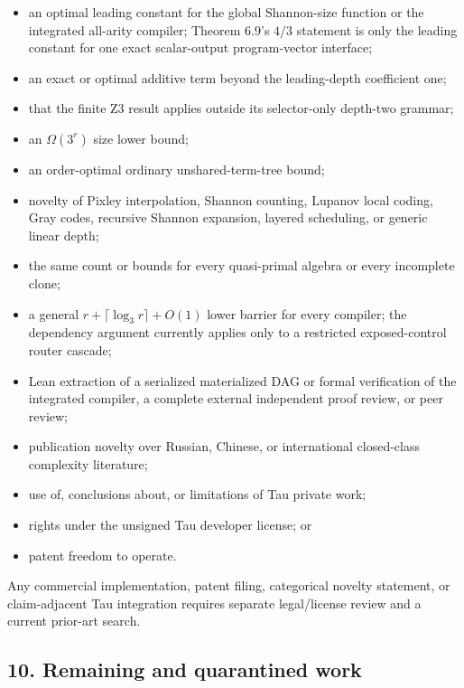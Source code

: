 \documentclass[
  11pt,
]{article}
\providecommand{\tightlist}{%
  \setlength{\itemsep}{0pt}\setlength{\parskip}{0pt}}
\theoremstyle{definition}
\theoremstyle{remark}
\begin{document}
\begin{itemize}
\tightlist
\item
  an optimal leading constant for the global Shannon-size function or
  the integrated all-arity compiler; Theorem 6.9's \(4/3\) statement is
  only the leading constant for one exact scalar-output program-vector
  interface;
\item
  an exact or optimal additive term beyond the leading-depth coefficient
  one;
\item
  that the finite Z3 result applies outside its selector-only depth-two
  grammar;
\item
  an \(\Omega(3^r)\) size lower bound;
\item
  an order-optimal ordinary unshared-term-tree bound;
\item
  novelty of Pixley interpolation, Shannon counting, Lupanov local
  coding, Gray codes, recursive Shannon expansion, layered scheduling,
  or generic linear depth;
\item
  the same count or bounds for every quasi-primal algebra or every
  incomplete clone;
\item
  a general \(r+\lceil \log_3 r \rceil+O(1)\) lower barrier for every
  compiler; the dependency argument currently applies only to a
  restricted exposed-control router cascade;
\item
  Lean extraction of a serialized materialized DAG or formal
  verification of the integrated compiler, a complete external
  independent proof review, or peer review;
\item
  publication novelty over Russian, Chinese, or international
  closed-class complexity literature;
\item
  use of, conclusions about, or limitations of Tau private work;
\item
  rights under the unsigned Tau developer license; or
\item
  patent freedom to operate.
\end{itemize}

Any commercial implementation, patent filing, categorical novelty
statement, or claim-adjacent Tau integration requires separate
legal/license review and a current prior-art search.

\hypertarget{remaining-and-quarantined-work}{%
\subsection{10. Remaining and quarantined
work}\label{remaining-and-quarantined-work}}
\end{document}
